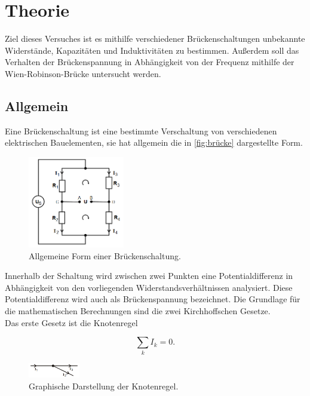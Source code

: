 \section{Theorie}
\label{sec:Theorie}
Ziel dieses Versuches ist es mithilfe verschiedener Brückenschaltungen unbekannte Widerstände, Kapazitäten und Induktivitäten zu bestimmen.
Außerdem soll das Verhalten der Brückenspannung in Abhängigkeit von der Frequenz mithilfe der Wien-Robinson-Brücke untersucht werden.

\subsection{Allgemein}
\label{subsec:allgemein}
Eine Brückenschaltung ist eine bestimmte Verschaltung von verschiedenen elektrischen Bauelementen, sie hat allgemein die in \autoref{fig:brücke} dargestellte Form.

\begin{figure}[H]
    \centering
    \includegraphics[height=4cm]{build/allgemein.PNG}
    \caption{Allgemeine Form einer Brückenschaltung.\cite[216]{V302}}
    \label{fig:brücke}
\end{figure}

\noindent Innerhalb der Schaltung wird zwischen zwei Punkten eine Potentialdifferenz in Abhängigkeit von den vorliegenden Widerstandsverhältnissen analysiert.
Diese Potentialdifferenz wird auch als Brückenspannung bezeichnet.
Die Grundlage für die mathematischen Berechnungen sind die zwei Kirchhoffschen Gesetze.\\
Das erste Gesetz ist die Knotenregel

\begin{equation}
    \sum_k I_k = 0 .
    \label{eqn:knoten}
\end{equation}

\begin{figure}[H]
    \centering
    \includegraphics[width=0.2\textwidth]{build/knoten.PNG}
    \caption{Graphische Darstellung der Knotenregel.\cite[217]{V302}}
    \label{fig:knoten}
\end{figure}

